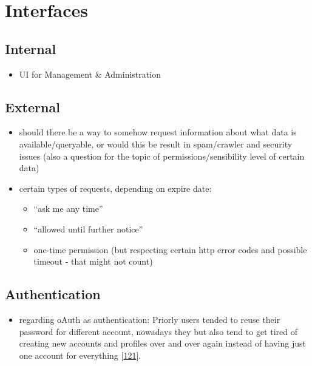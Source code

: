 \documentclass[12pt,english,a4paper,titlepage,cleardoublepage=empty,dottedtoc]{report}
\providecommand{\tightlist}{%
  \setlength{\itemsep}{0pt}\setlength{\parskip}{0pt}}
\begin{document}
\section{Interfaces}\label{interfaces-1}

\subsection{Internal}\label{internal}

\begin{itemize}
\tightlist
\item
  UI for Management \& Administration
\end{itemize}

\subsection{External}\label{external}

\begin{itemize}
\item
  should there be a way to somehow request information about what data
  is available/queryable, or would this be result in spam/crawler and
  security issues (also a question for the topic of
  permissions/sensibility level of certain data)
\item
  certain types of requests, depending on expire date:

  \begin{itemize}
  \tightlist
  \item
    ``ask me any time''
  \item
    ``allowed until further notice''
  \item
    one-time permission (but respecting certain http error codes and
    possible timeout - that might not count)
  \end{itemize}
\end{itemize}

\subsection{Authentication}\label{authentication-1}

\begin{itemize}
\tightlist
\item
  regarding oAuth as authentication: Priorly users tended to reuse their
  password for different account, nowadays they but also tend to get
  tired of creating new accounts and profiles over and over again
  instead of having just one account for everything
  {[}\protect\hyperlink{ref-web_2009-success-of-facebook-connect}{121}{]}.
\end{itemize}
\end{document}
